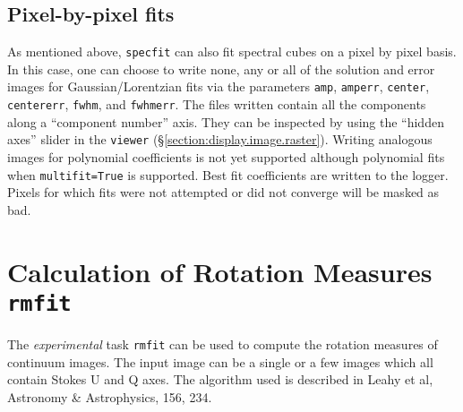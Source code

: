 \subsection{Pixel-by-pixel fits}
\label{section:analysis.specfit.pixel}
As mentioned above, {\tt specfit} can also fit spectral cubes on a
pixel by pixel basis. In this case, one can choose to write none, any
or all of the solution and error images for Gaussian/Lorentzian fits
via the parameters {\tt amp}, {\tt amperr}, {\tt center}, {\tt
  centererr}, {\tt fwhm}, and {\tt fwhmerr}. The files written contain
all the components along a ``component number'' axis. They can be
inspected by using the ``hidden axes'' slider in the {\tt viewer}
(\S\ref{section:display.image.raster}). Writing analogous images for
polynomial coefficients is not yet supported although polynomial fits
when {\tt multifit=True} is supported. Best fit coefficients are
written to the logger. Pixels for which fits were not attempted or did
not converge will be masked as bad.


\section{Calculation of Rotation Measures {\tt rmfit}}
\label{section:analysis.rmfit}

The {\it experimental} task {\tt rmfit} can be used to compute the
rotation measures of continuum images. The input image can be a single
or a few images which all contain Stokes U and Q axes. The algorithm
used is described in Leahy et al, Astronomy \& Astrophysics, 156, 234.

